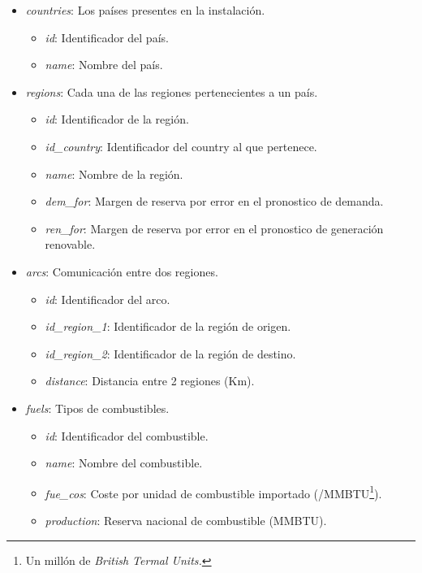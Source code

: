 \label{title:DiccionarioDatos}
\begin{itemize}
	
	\item \textit{countries}: Los países presentes en la instalación.
	\begin{itemize}
		\item \textit{id}: Identificador del país.		
		\item \textit{name}: Nombre del país.
	\end{itemize}
	
	\item \textit{regions}: Cada una de las regiones pertenecientes a un país.
	\begin{itemize}
		\item \textit{id}: Identificador de la región.		
		\item \textit{id\_country}: Identificador del country al que pertenece.
		\item \textit{name}: Nombre de la región.
		\item \textit{dem\_for}: Margen de reserva por error en el pronostico de demanda.
		\item \textit{ren\_for}: Margen de reserva por error en el pronostico de generación renovable.
	\end{itemize}

	\item \textit{arcs}: Comunicación entre dos regiones.
	\begin{itemize}
		\item \textit{id}: Identificador del arco.		
		\item \textit{id\_region\_1}: Identificador de la región de origen.
		\item \textit{id\_region\_2}: Identificador de la región de destino.
		\item \textit{distance}: Distancia entre 2 regiones (Km).
	\end{itemize}
	
	\item \textit{fuels}: Tipos de combustibles.
	\begin{itemize}
		\item \textit{id}: Identificador del combustible.		
		\item \textit{name}: Nombre del combustible.
		\item \textit{fue\_cos}: Coste por unidad de combustible importado (\textdollar/MMBTU\footnote{Un millón de \textit{British Termal Units.}}).
		\item \textit{production}: Reserva nacional de combustible (MMBTU).
	\end{itemize}
	

\end{itemize}
